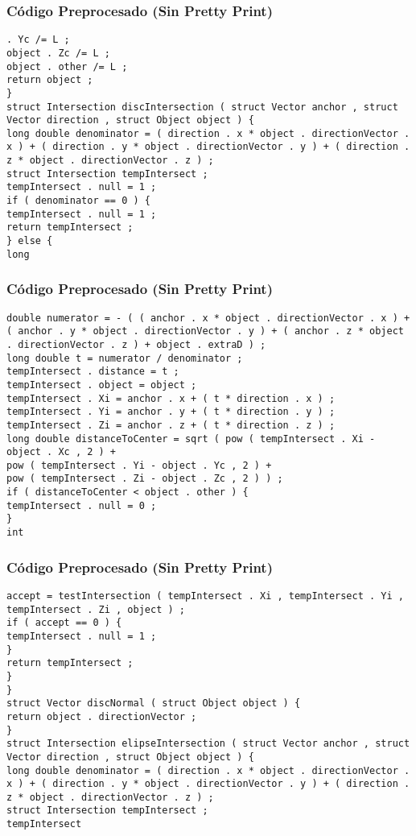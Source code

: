 \documentclass{beamer}
\begin{document}
\begin{frame}[fragile]
\frametitle{C\'odigo Preprocesado (Sin Pretty Print)}
\begin{lstlisting}[style=CStyle]
. Yc /= L ; 
object . Zc /= L ; 
object . other /= L ; 
return object ; 
} 
struct Intersection discIntersection ( struct Vector anchor , struct Vector direction , struct Object object ) { 
long double denominator = ( direction . x * object . directionVector . x ) + ( direction . y * object . directionVector . y ) + ( direction . z * object . directionVector . z ) ; 
struct Intersection tempIntersect ; 
tempIntersect . null = 1 ; 
if ( denominator == 0 ) { 
tempIntersect . null = 1 ; 
return tempIntersect ; 
} else { 
long \end{lstlisting}
\end{frame}
\begin{frame}[fragile]
\frametitle{C\'odigo Preprocesado (Sin Pretty Print)}
\begin{lstlisting}[style=CStyle]
double numerator = - ( ( anchor . x * object . directionVector . x ) + ( anchor . y * object . directionVector . y ) + ( anchor . z * object . directionVector . z ) + object . extraD ) ; 
long double t = numerator / denominator ; 
tempIntersect . distance = t ; 
tempIntersect . object = object ; 
tempIntersect . Xi = anchor . x + ( t * direction . x ) ; 
tempIntersect . Yi = anchor . y + ( t * direction . y ) ; 
tempIntersect . Zi = anchor . z + ( t * direction . z ) ; 
long double distanceToCenter = sqrt ( pow ( tempIntersect . Xi - object . Xc , 2 ) + 
pow ( tempIntersect . Yi - object . Yc , 2 ) + 
pow ( tempIntersect . Zi - object . Zc , 2 ) ) ; 
if ( distanceToCenter < object . other ) { 
tempIntersect . null = 0 ; 
} 
int \end{lstlisting}
\end{frame}
\begin{frame}[fragile]
\frametitle{C\'odigo Preprocesado (Sin Pretty Print)}
\begin{lstlisting}[style=CStyle]
accept = testIntersection ( tempIntersect . Xi , tempIntersect . Yi , tempIntersect . Zi , object ) ; 
if ( accept == 0 ) { 
tempIntersect . null = 1 ; 
} 
return tempIntersect ; 
} 
} 
struct Vector discNormal ( struct Object object ) { 
return object . directionVector ; 
} 
struct Intersection elipseIntersection ( struct Vector anchor , struct Vector direction , struct Object object ) { 
long double denominator = ( direction . x * object . directionVector . x ) + ( direction . y * object . directionVector . y ) + ( direction . z * object . directionVector . z ) ; 
struct Intersection tempIntersect ; 
tempIntersect \end{lstlisting}
\end{frame}
\end{document}

